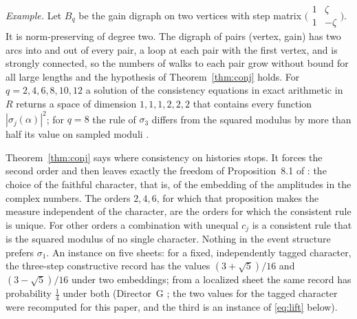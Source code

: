 \emph{Example.} Let $B_q$ be the gain digraph on two vertices with step matrix $\bigl(\begin{smallmatrix}1&\zeta\\1&-\zeta\end{smallmatrix}\bigr)$. It is norm-preserving of degree two. The digraph of pairs (vertex, gain) has two arcs into and out of every pair, a loop at each pair with the first vertex, and is strongly connected, so the numbers of walks to each pair grow without bound for all large lengths and the hypothesis of Theorem~\ref{thm:conj} holds. For $q=2,4,6,8,10,12$ a solution of the consistency equations in exact arithmetic in $R$ returns a space of dimension $1,1,1,2,2,2$ that contains every function $|\sigma_j(\alpha)|^2$; for $q=8$ the rule of $\sigma_3$ differs from the squared modulus by more than half its value on sampled moduli \cite{comp4s}.

Theorem~\ref{thm:conj} says where consistency on histories stops. It forces the second order and then leaves exactly the freedom of Proposition~8.1 of \cite{g8}: the choice of the faithful character, that is, of the embedding of the amplitudes in the complex numbers. The orders $2,4,6$, for which that proposition makes the measure independent of the character, are the orders for which the consistent rule is unique. For other orders a combination with unequal $c_j$ is a consistent rule that is the squared modulus of no single character. Nothing in the event structure prefers $\sigma_1$. An instance on five sheets: for a fixed, independently tagged character, the three-step constructive record has the values $(3+\sqrt5)/16$ and $(3-\sqrt5)/16$ under two embeddings; from a localized sheet the same record has probability $\tfrac14$ under both (Director~G \cite{dg,dgn}; the two values for the tagged character were recomputed for this paper, and the third is an instance of \eqref{eq:lift} below).

